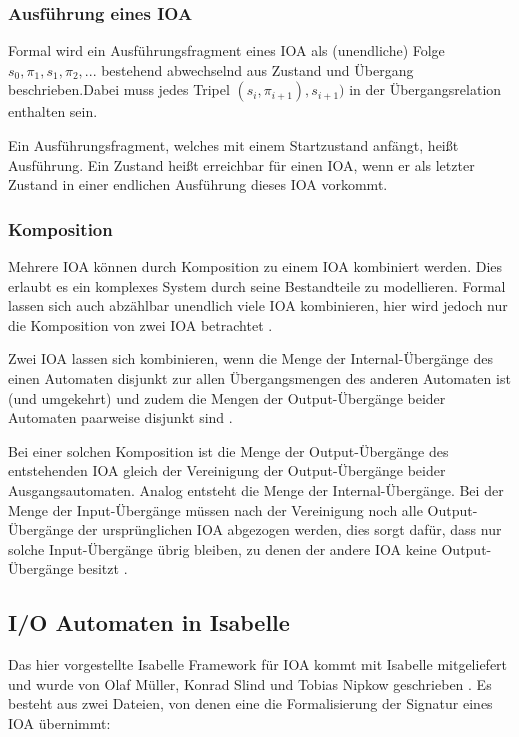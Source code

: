 \documentclass[12pt,a4paper]{tucarticle2019}
\begin{document}
	\subsubsection{Ausführung eines IOA}
	Formal wird ein Ausführungsfragment eines IOA als (unendliche) Folge $s_0, \pi_1, s_1, \pi_2,...$ bestehend abwechselnd aus Zustand und Übergang beschrieben.Dabei muss jedes Tripel $(s_i, \pi_{i+1}), s_{i+1})$ in der Übergangsrelation enthalten sein. 
	
	Ein Ausführungsfragment, welches mit einem Startzustand anfängt, heißt Ausführung. Ein Zustand heißt erreichbar für einen IOA, wenn er als letzter Zustand in einer endlichen Ausführung dieses IOA vorkommt.
	
	\subsubsection{Komposition}
	Mehrere IOA können durch Komposition zu einem IOA kombiniert werden. Dies erlaubt es ein komplexes System durch seine Bestandteile zu modellieren. Formal lassen sich auch abzählbar unendlich viele IOA kombinieren, hier wird jedoch nur die Komposition von zwei IOA betrachtet \cite{lynchbook}.
	
	Zwei IOA lassen sich kombinieren, wenn die Menge der Internal-Übergänge des einen Automaten disjunkt zur allen Übergangsmengen des anderen Automaten ist (und umgekehrt) und zudem die Mengen der Output-Übergänge beider Automaten paarweise disjunkt sind \cite{lynchbook}.
	
	Bei einer solchen Komposition ist die Menge der Output-Übergänge des entstehenden IOA gleich der Vereinigung der Output-Übergänge beider Ausgangsautomaten. Analog entsteht die Menge der Internal-Übergänge. Bei der Menge der Input-Übergänge müssen nach der Vereinigung noch alle Output-Übergänge der ursprünglichen IOA abgezogen werden, dies sorgt dafür, dass nur solche Input-Übergänge übrig bleiben, zu denen der andere IOA keine Output-Übergänge besitzt \cite{lynchbook}.
	
	\subsection{I/O Automaten in Isabelle}
	Das hier vorgestellte Isabelle Framework für IOA kommt mit Isabelle mitgeliefert und wurde von Olaf Müller, Konrad Slind und Tobias Nipkow geschrieben \cite{ioaCode}. Es besteht aus zwei Dateien, von denen eine die Formalisierung der Signatur eines IOA übernimmt: 
	
\end{document}
